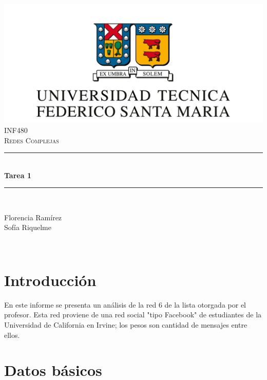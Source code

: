 \documentclass[12pt]{article}
\begin{document}
\begin{titlepage}
\newcommand{\HRule}{\rule{\linewidth}{0.5mm}} 
\center

\includegraphics[scale=0.4]{images/logo-usm.png}\\
\vspace{0.6cm}
\textsc{\large INF480}\\[0.5cm] %
\textsc{\Large Redes Complejas}\\[0.5cm] %

\HRule \\[0.4cm]
{ \huge \bfseries Tarea 1}\\[0.4cm] %
\HRule \\[1.5cm]
 
\begin{minipage}{0.4\textwidth}
\begin{center} \large
Florencia Ramírez\\
Sofía Riquelme
\end{center}

\end{minipage}\\[2cm]

\vfill %

\end{titlepage}

\section{Introducción}
En este informe se presenta un análisis de la red 6 de la lista otorgada por el profesor. Esta red proviene de una red social "tipo Facebook" de estudiantes de la Universidad de California en Irvine; los pesos son cantidad de mensajes entre ellos.
\section{Datos básicos}
\end{document}
